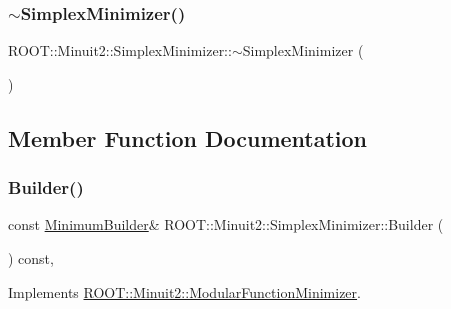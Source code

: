 \mbox{\label{classROOT_1_1Minuit2_1_1SimplexMinimizer_a52f955e2ed5e48a5816300d1c82c4841}} 
\subsubsection{\texorpdfstring{$\sim$SimplexMinimizer()}{~SimplexMinimizer()}\hspace{0.1cm}{\footnotesize\ttfamily [2/2]}}
{\footnotesize\ttfamily R\+O\+O\+T\+::\+Minuit2\+::\+Simplex\+Minimizer\+::$\sim$\+Simplex\+Minimizer (\begin{DoxyParamCaption}{ }\end{DoxyParamCaption})\hspace{0.3cm}{\ttfamily [inline]}}



\subsection{Member Function Documentation}
\mbox{\label{classROOT_1_1Minuit2_1_1SimplexMinimizer_a388494c3f9b45ce6c5d91decef737608}} 
\subsubsection{\texorpdfstring{Builder()}{Builder()}\hspace{0.1cm}{\footnotesize\ttfamily [1/2]}}
{\footnotesize\ttfamily const \mbox{\hyperlink{classROOT_1_1Minuit2_1_1MinimumBuilder}{Minimum\+Builder}}\& R\+O\+O\+T\+::\+Minuit2\+::\+Simplex\+Minimizer\+::\+Builder (\begin{DoxyParamCaption}{ }\end{DoxyParamCaption}) const\hspace{0.3cm}{\ttfamily [inline]}, {\ttfamily [virtual]}}



Implements \mbox{\hyperlink{classROOT_1_1Minuit2_1_1ModularFunctionMinimizer_a13e98551cf14e927c61e1e34ecf8ba8b}{R\+O\+O\+T\+::\+Minuit2\+::\+Modular\+Function\+Minimizer}}.

